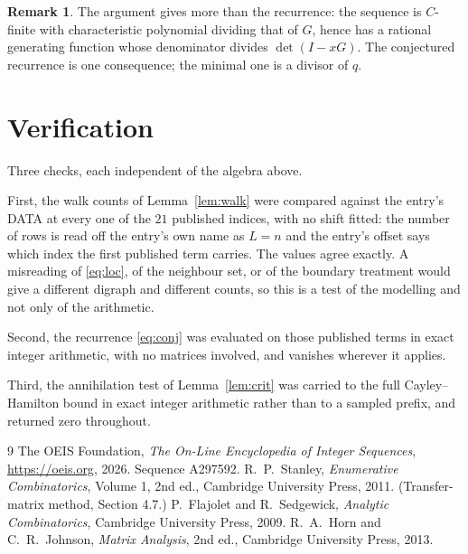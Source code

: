 \documentclass[11pt,a4paper]{article}
\theoremstyle{plain}
\theoremstyle{definition}
\newtheorem{remark}[theorem]{Remark}
\begin{document}
\begin{remark}
The argument gives more than the recurrence: the sequence is $C$-finite with characteristic
polynomial dividing that of $G$, hence has a rational generating function whose denominator
divides $\det(I-xG)$. The conjectured recurrence is one consequence; the minimal one is a
divisor of $q$.
\end{remark}

\section{Verification}

Three checks, each independent of the algebra above.

First, the walk counts of Lemma~\ref{lem:walk} were compared against the entry's DATA at
every one of the $21$ published indices, with no shift fitted: the number of rows is
read off the entry's own name as $L=n$ and the entry's offset says which index the first
published term carries. The values agree exactly. A misreading of \eqref{eq:loc}, of the
neighbour set, or of the boundary treatment would give a different digraph and different
counts, so this is a test of the modelling and not only of the arithmetic.

Second, the recurrence \eqref{eq:conj} was evaluated on those published terms in exact
integer arithmetic, with no matrices involved, and vanishes wherever it applies.

Third, the annihilation test of Lemma~\ref{lem:crit} was carried to the full
Cayley--Hamilton bound in exact integer arithmetic rather than to a sampled prefix, and
returned zero throughout.

\begin{thebibliography}{9}
 The OEIS Foundation, \emph{The On-Line Encyclopedia of Integer
Sequences}, \url{https://oeis.org}, 2026. Sequence A297592.
 R.~P.~Stanley, \emph{Enumerative Combinatorics}, Volume 1, 2nd ed.,
Cambridge University Press, 2011. (Transfer-matrix method, Section 4.7.)
 P.~Flajolet and R.~Sedgewick, \emph{Analytic Combinatorics}, Cambridge
University Press, 2009.
 R.~A.~Horn and C.~R.~Johnson, \emph{Matrix Analysis}, 2nd ed., Cambridge
University Press, 2013.
\end{thebibliography}
\end{document}
